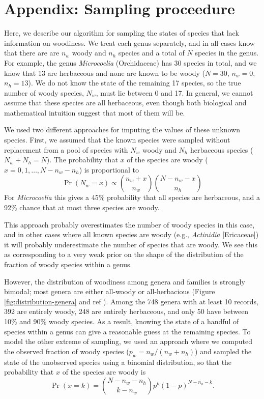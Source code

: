 \documentclass[12pt]{article}
\begin{document}
\section{Appendix: Sampling proceedure}

Here, we describe our algorithm for sampling the states of species
that lack information on woodiness. We treat each genus separately,
and in all cases know that there are are $n_w$ woody and $n_h$ species
and a total of $N$ species in the genus.
%
For example, the genus \textit{Microcoelia} (Orchidaceae) has 30
species in total, and we know that 13 are herbaceous and none are
known to be woody ($N = 30$, $n_w = 0$, $n_h = 13$). We do not know
the state of the remaining 17 species, so the true number of woody
species, $N_w$, must lie between 0 and 17. In general, we cannot
assume that these species are all herbaceous, even though both
biological and mathematical intuition suggest that most of them will
be.

We used two different approaches for imputing the values of these
unknown species. First, we assumed that the known species were
sampled without replacement from a pool of species with $N_w$ woody
and $N_h$ herbaceous species ($N_w + N_h = N$). The probability that
$x$ of the species are woody ($x = 0, 1, \ldots, N - n_w - n_h$) is
proportional to
\begin{equation}
  \Pr(N_w = x) \propto {n_w + x \choose n_w}
  {N - n_w - x \choose n_h}
\end{equation}
For \textit{Microcoelia} this gives a 45\% probability that all
species are herbaceous, and a 92\% chance that at most three species
are woody.

This approach probably overestimates the number of woody species in
this case, and in other cases where all known species are woody (e.g.,
\textit{Actinidia} [Ericaceae]) it will probably underestimate the
number of species that are woody. We see this as corresponding to a
very weak prior on the shape of the distribution of the fraction of
woody species within a genus.

However, the distribution of woodiness among genera and families is
strongly bimodal; most genera are either all-woody or all-herbacious
(Figure \ref{fig:distribution-genera} and ref
\citep{sinnott1915evolution}).  Among the 748 genera with at least 10
records, 392 are entirely woody, 248 are entirely herbaceous, and only
50 have between 10\% and 90\% woody species. As a result, knowing the
state of a handful of species within a genus can give a reasonable
guess at the remaining species.
To model the other extreme of sampling, we used an approach where we
computed the observed fraction of woody species ($p_w = n_w / (n_w +
n_h)$) and sampled the state of the unobserved species using a
binomial distribution, so that the probability that $x$ of the species
are woody is
\begin{equation}
  \Pr(x = k) = {N - n_w - n_h \choose k - n_w} 
  p^k (1-p)^{N - n_h - k}.
\end{equation}
\end{document}
